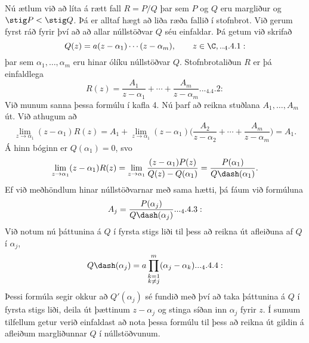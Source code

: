 Nú ætlum við að líta á rætt fall  $R=P/Q$ þar sem  $P$ og $Q$ 
eru margliður og $\stig P < \stig Q$.  Þá er 
alltaf hægt að liða ræða fallið
í stofnbrot.  Við gerum fyrst ráð fyrir því að
að allar núllstöðvar $Q$ séu einfaldar.  Þá getum við
skrifað
 \begin{equation*}Q(z)= a(z-\alpha_1)\cdots(z-\alpha_m), \qquad z\in \C,


.. _4.4.1:

 \end{equation*}
þar sem $\alpha_1,\dots,\alpha_m$ eru hinar ólíku núllstöðvar $Q$.
Stofnbrotaliðun $R$ er þá einfaldlega
 \begin{equation*}R(z) = \dfrac {A_1}{z-\alpha_1}+\cdots+\dfrac {A_m}{z-\alpha_m}.


.. _4.4.2:

 \end{equation*}
Við munum sanna þessa formúlu í kafla 4.
Nú þarf að reikna stuðlana $A_1,\dots,A_m$ út.  Við athugum að
 $$\lim\limits_{z\to\alpha_1} (z-\alpha_1)R(z) = A_1
+\lim\limits_{z\to\alpha_1}
(z-{\alpha}_1)\bigg(
\dfrac {A_2}{z-\alpha_2}+\cdots+\dfrac {A_m}{z-\alpha_m}
\bigg)=A_1.
 $$
{Á} hinn bóginn er $Q(\alpha_1)=0$, svo
 $$\lim\limits_{z\to\alpha_1}(z-\alpha_1)R(z) =
\lim\limits_{z\to
\alpha_1}\dfrac{(z-\alpha_1)P(z)}{Q(z)-Q(\alpha_1)}=
\dfrac{P(\alpha_1)}{Q\dash(\alpha_1)}.
 $$
Ef við meðhöndlum hinar núllstöðvarnar með sama hætti, þá fáum við
formúluna
 \begin{equation*}A_j=\dfrac{P(\alpha_j)}{Q\dash(\alpha_j)}.


.. _4.4.3:

 \end{equation*}
Við notum nú þáttunina á $Q$ í fyrsta stigs liði til þess að 
reikna út afleiðuna af $Q$ í ${\alpha}_j$,
 \begin{equation*}Q\dash(\alpha_j)=a\prod_{\substack{k=1\\ k\neq
 j}}^m
(\alpha_j-\alpha_k).


.. _4.4.4:

 \end{equation*}
Þessi formúla segir okkur að $Q'(\alpha_j)$ sé fundið með því að
taka þáttunina á $Q$ í fyrsta stigs liði, deila út þættinum
$z-\alpha_j$ og stinga síðan inn $\alpha_j$ fyrir $z$.
Í sumum tilfellum getur verið einfaldast að nota þessa formúlu til
þess að reikna út gildin á afleiðum margliðunnar $Q$ í núllstöðvunum.


